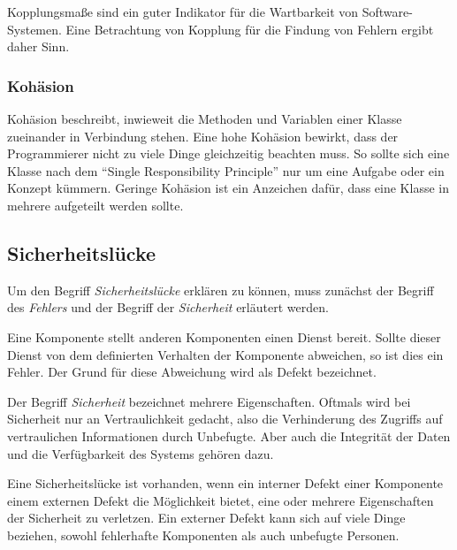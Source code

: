 Kopplungsmaße sind ein guter Indikator für die Wartbarkeit von Software-Systemen.
Eine Betrachtung von Kopplung für die Findung von Fehlern ergibt daher Sinn.

\subsubsection{Kohäsion}
Kohäsion beschreibt, inwieweit die Methoden und Variablen einer Klasse zueinander in Verbindung stehen.
Eine hohe Kohäsion bewirkt, dass der Programmierer nicht zu viele Dinge gleichzeitig beachten muss.
So sollte sich eine Klasse nach dem "`Single Responsibility Principle"' nur um eine Aufgabe oder ein Konzept kümmern.
Geringe Kohäsion ist ein Anzeichen dafür, dass eine Klasse in mehrere aufgeteilt werden sollte.

\subsection{Sicherheitslücke}
Um den Begriff \emph{Sicherheitslücke} erklären zu können, muss zunächst der Begriff des \emph{Fehlers} und der Begriff der \emph{Sicherheit} erläutert werden.

Eine Komponente stellt anderen Komponenten einen Dienst bereit.
Sollte dieser Dienst von dem definierten Verhalten der Komponente abweichen, so ist dies ein Fehler.
Der Grund für diese Abweichung wird als Defekt bezeichnet.

Der Begriff \emph{Sicherheit} bezeichnet mehrere Eigenschaften.
Oftmals wird bei Sicherheit nur an Vertraulichkeit gedacht, also die Verhinderung des Zugriffs auf vertraulichen Informationen durch Unbefugte.
Aber auch die Integrität der Daten und die Verfügbarkeit des Systems gehören dazu.

Eine Sicherheitslücke ist vorhanden, wenn ein interner Defekt einer Komponente einem externen Defekt die Möglichkeit bietet, eine oder mehrere Eigenschaften der Sicherheit zu verletzen.
Ein externer Defekt kann sich auf viele Dinge beziehen, sowohl fehlerhafte Komponenten als auch unbefugte Personen.

